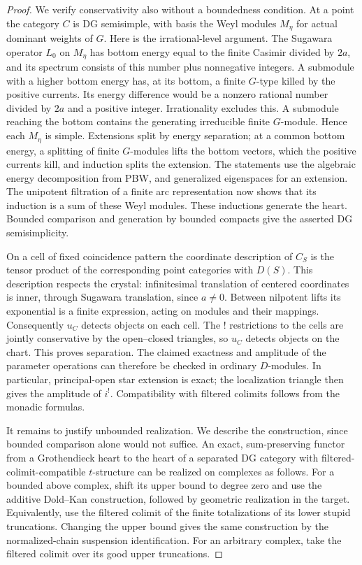 \begin{proof}
We verify conservativity also without a boundedness condition.
At a point the category $C$ is DG semisimple, with basis the Weyl
modules $M_\eta$ for actual dominant weights of $G$.  Here is the
irrational-level argument.  The Sugawara operator $L_0$ on $M_\eta$
has bottom energy equal to the finite Casimir divided by $2a$, and
its spectrum consists of this number plus nonnegative integers.
A submodule with a higher bottom energy has, at its bottom, a finite
$G$-type killed by the positive currents.  Its energy difference
would be a nonzero rational number divided by $2a$ and a positive
integer.  Irrationality excludes this.  A submodule reaching the
bottom contains the generating irreducible finite $G$-module.
Hence each $M_\eta$ is simple.  Extensions split by energy separation;
at a common bottom energy, a splitting of finite $G$-modules lifts
the bottom vectors, which the positive currents kill, and induction
splits the extension.  The statements use the algebraic energy
decomposition from PBW, and generalized eigenspaces for an extension.
The unipotent filtration of a finite arc representation now shows
that its induction is a sum of these Weyl modules.  These inductions
generate the heart.  Bounded comparison and generation by bounded
compacts give the asserted DG semisimplicity.

On a cell of fixed coincidence pattern the coordinate description
of $C_S$ is the tensor product of the corresponding point categories
with $D(S)$.  This description respects the crystal: infinitesimal
translation of centered coordinates is inner, through Sugawara
translation, since $a\ne0$.  Between nilpotent lifts its exponential
is a finite expression, acting on modules and their mappings.
Consequently $u_C$ detects objects on each cell.  The ! restrictions
to the cells are jointly conservative by the open--closed triangles,
so $u_C$ detects objects on the chart.  This proves separation.
The claimed exactness and amplitude of the parameter operations
can therefore be checked in ordinary $D$-modules.  In particular,
principal-open star extension is exact; the localization triangle
then gives the amplitude of $i^!$.  Compatibility with filtered
colimits follows from the monadic formulas.

It remains to justify unbounded realization.  We describe the
construction, since bounded comparison alone would not suffice.
An exact, sum-preserving functor from a Grothendieck heart to the
heart of a separated DG category with filtered-colimit-compatible
$t$-structure can be realized on complexes as follows.  For a
bounded above complex, shift its upper bound to degree zero and
use the additive Dold--Kan construction, followed by geometric
realization in the target.  Equivalently, use the filtered colimit
of the finite totalizations of its lower stupid truncations.
Changing the upper bound gives the same construction by the
normalized-chain suspension identification.  For an arbitrary
complex, take the filtered colimit over its good upper truncations.


\end{proof}
